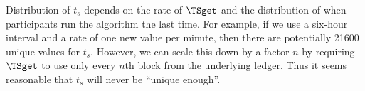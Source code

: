 Distribution of \(t_s\) depends on the rate of \(\TSget\) and the distribution 
of when participants run the algorithm the last time.
For example, if we use a six-hour interval and a rate of one new value per 
minute, then there are potentially 21600 unique values for \(t_s\).
However, we can scale this down by a factor \(n\) by requiring \(\TSget\) to 
use only every \(n\)th block from the underlying ledger.
Thus it seems reasonable that \(t_s\) will never be \enquote{unique enough}.
